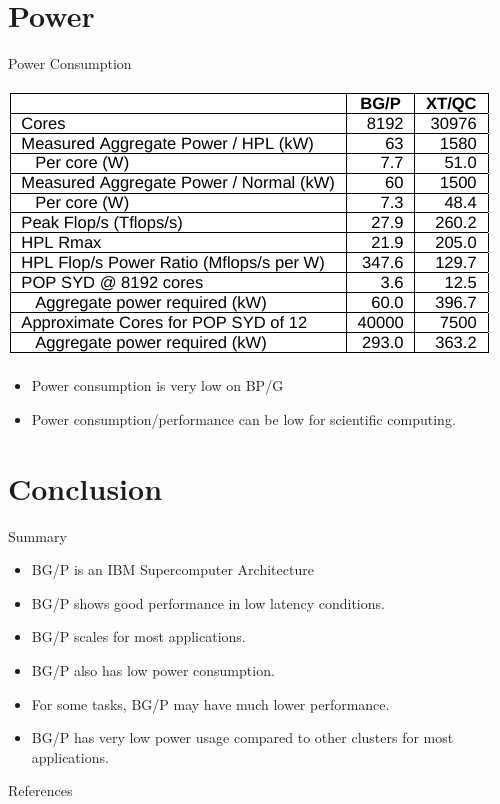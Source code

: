 \documentclass{beamer}
\begin{document}
\section{Power}
\begin{frame}{Power Consumption}
\begin{center}
\includegraphics[scale=.45]{figs/power.png}
\end{center}
\begin{itemize}
\item Power consumption is very low on BP/G
\item Power consumption/performance can be low for scientific computing.
\end{itemize}
\end{frame}


\section{Conclusion}
\begin{frame}{Summary}
\begin{itemize}
\item BG/P is an IBM Supercomputer Architecture
\item BG/P shows good performance in low latency conditions.
\item BG/P scales for most applications.
\item BG/P also has low power consumption.
\item For some tasks, BG/P may have much lower performance.
\item BG/P has very low power usage compared to other clusters for most applications.
\end{itemize}
\end{frame}

\begin{frame}{References}

\nocite{*}
\end{frame}
\end{document}
